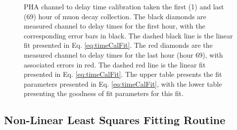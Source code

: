 \documentclass[
    aps, 
    twocolumn, 
    secnumarabic, 
    balancelastpage, 
    amsmath, 
    amssymb, 
    nofootinbib, 
    floatfix
]{revtex4-2}
\begin{document}
\begin{figure}[t]
\begin{subfigure}[t]{12cm}
\begin{tabular}{c|cc}
		\end{tabular}
     	\end{subfigure}
     	\bigskip
	\caption{PHA channel to delay time calibration taken the first (1) and last (69) hour of muon decay collection. The black diamonds are measured channel to delay times for the first hour, with the corresponding error bars in black. The dashed black line is the linear fit presented in Eq. \eqref{eq:timeCalFit}. The red diamonds are the measured channel to delay times for the last hour (hour 69), with associated errors in red. The dashed red line is the linear fit presented in Eq. \eqref{eq:timeCalFit}. The upper table presents the fit parameters presented in Eq. \eqref{eq:timeCalFit}, with the lower table presenting the goodness of fit parameters for this fit.}
	\label{fig:time_calibration}
\end{figure}

\subsection{Non-Linear Least Squares Fitting Routine}
\label{sec:fitting}
\end{document}
